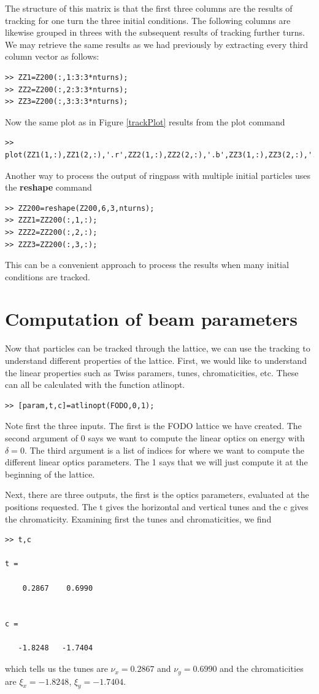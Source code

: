 \documentclass[acus]{article}
\newcommand{\mfun}[1]{{\bf{#1}}}
\begin{document}
The structure of this matrix is that the first three columns are the results of tracking
for one turn the three initial conditions.  The following columns are likewise grouped in
threes with the subsequent results of tracking further turns.  We may retrieve the same results
as we had previously by extracting every third column vector as follows:
\begin{verbatim}
>> ZZ1=Z200(:,1:3:3*nturns);
>> ZZ2=Z200(:,2:3:3*nturns);
>> ZZ3=Z200(:,3:3:3*nturns);
\end{verbatim}
Now the same plot as in Figure \ref{trackPlot} results from the plot command
\begin{verbatim}
>> plot(ZZ1(1,:),ZZ1(2,:),'.r',ZZ2(1,:),ZZ2(2,:),'.b',ZZ3(1,:),ZZ3(2,:),'.k')
\end{verbatim}
Another way to process the output of ringpass with multiple initial particles uses
the \mfun{reshape} command
\begin{verbatim}
>> ZZ200=reshape(Z200,6,3,nturns);
>> ZZZ1=ZZ200(:,1,:);
>> ZZZ2=ZZ200(:,2,:);
>> ZZZ3=ZZ200(:,3,:);
\end{verbatim}
This can be a convenient approach to process the results when many initial 
conditions are tracked.

\section{Computation of beam parameters}
Now that particles can be tracked through the lattice, we can use the
tracking to understand different properties of the lattice.  First, we
would like to understand the linear properties such as Twiss
paramers, tunes, chromaticities, etc.
These can all be calculated with the function atlinopt.
\begin{verbatim}
>> [param,t,c]=atlinopt(FODO,0,1);
\end{verbatim}
Note first the three inputs.  The first is the FODO lattice we 
have created.  The second argument of 0 says we want to compute
the linear optics on energy with $\delta=0$.  The third argument
is a list of indices for where we want to compute the different 
linear optics parameters.  The 1 says that we will just compute it
at the beginning of the lattice.  

Next, there are three outputs, the first is the optics parameters,
evaluated at the positions requested.  The t gives the horizontal and
vertical tunes and the c gives the chromaticity.  Examining first the
tunes and chromaticities, we find
\begin{verbatim}
>> t,c

t =

    0.2867    0.6990


c =

   -1.8248   -1.7404
\end{verbatim}
which tells us the tunes are $\nu_x = 0.2867$ and $\nu_y = 0.6990$ and the 
chromaticities are $\xi_x = -1.8248$, $\xi_y = -1.7404$.
\end{document}
